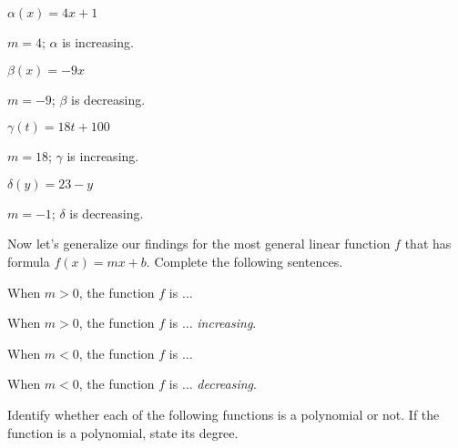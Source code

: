 \begin{exercises}
\begin{problem}
\begin{multicols}{4}
\begin{subproblem}
    $\alpha(x)=4x+1$ 
    \begin{shortsolution}
    $m=4$; $\alpha$ is increasing. 
    \end{shortsolution}
\end{subproblem}
\begin{subproblem}
    $\beta(x)=-9x$ 
    \begin{shortsolution}
    $m=-9$; $\beta$ is decreasing. 
    \end{shortsolution}
\end{subproblem}
\begin{subproblem}
    $\gamma(t)=18t+100$ 
    \begin{shortsolution}
    $m=18$; $\gamma$ is increasing.
    \end{shortsolution}
\end{subproblem}
\begin{subproblem}
    $\delta(y)=23-y$ 
    \begin{shortsolution}
    $m=-1$; $\delta$ is decreasing. 
    \end{shortsolution}
\end{subproblem}
\end{multicols}
Now let's generalize our findings for the most general linear function $f$
that has formula $f(x)=mx+b$. Complete the following sentences.
\begin{subproblem}
When $m>0$, the function $f$ is $\ldots$  
    \begin{shortsolution}
     When $m>0$, the function $f$ is $\ldots$  \emph{increasing}.
    \end{shortsolution}
\end{subproblem}
\begin{subproblem}
When $m<0$, the function $f$ is $\ldots$  
    \begin{shortsolution}
     When $m<0$, the function $f$ is $\ldots$  \emph{decreasing}.
    \end{shortsolution}
\end{subproblem}
\end{problem}
\begin{problem}
Identify whether each of the following functions is a polynomial or not. 
If the function is a polynomial, state its degree.
\begin{multicols}{3}
\begin{subproblem}

\end{subproblem}
\end{multicols}
\end{problem}
\end{exercises}
